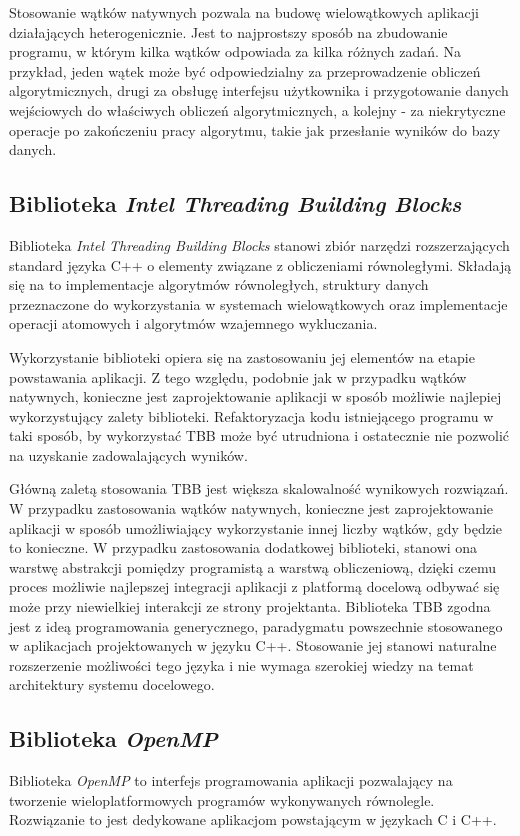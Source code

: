 Stosowanie wątków natywnych pozwala na budowę wielowątkowych aplikacji działających heterogenicznie. Jest to najprostszy sposób na zbudowanie programu, w którym kilka wątków odpowiada za kilka różnych zadań. Na przykład, jeden wątek może być odpowiedzialny za przeprowadzenie obliczeń algorytmicznych, drugi za obsługę interfejsu użytkownika i przygotowanie danych wejściowych do właściwych obliczeń algorytmicznych, a kolejny - za niekrytyczne operacje po zakończeniu pracy algorytmu, takie jak przesłanie wyników do bazy danych.

\subsection{Biblioteka \emph{Intel Threading Building Blocks}}

Biblioteka \emph{Intel Threading Building Blocks} stanowi zbiór narzędzi rozszerzających standard języka C++ o elementy związane z obliczeniami równoległymi. Składają się na to implementacje algorytmów równoległych, struktury danych przeznaczone do wykorzystania w systemach wielowątkowych oraz implementacje operacji atomowych i algorytmów wzajemnego wykluczania. \cite{Reinders2010}

Wykorzystanie biblioteki opiera się na zastosowaniu jej elementów na etapie powstawania aplikacji. Z tego względu, podobnie jak w przypadku wątków natywnych, konieczne jest zaprojektowanie aplikacji w sposób możliwie najlepiej wykorzystujący zalety biblioteki. Refaktoryzacja kodu istniejącego programu w taki sposób, by wykorzystać TBB może być utrudniona i ostatecznie nie pozwolić na uzyskanie zadowalających wyników.

Główną zaletą stosowania TBB jest większa skalowalność wynikowych rozwiązań. W przypadku zastosowania wątków natywnych, konieczne jest zaprojektowanie aplikacji w sposób umożliwiający wykorzystanie innej liczby wątków, gdy będzie to konieczne. W przypadku zastosowania dodatkowej biblioteki, stanowi ona warstwę abstrakcji pomiędzy programistą a warstwą obliczeniową, dzięki czemu proces możliwie najlepszej integracji aplikacji z platformą docelową odbywać się może przy niewielkiej interakcji ze strony projektanta.
Biblioteka TBB zgodna jest z ideą programowania generycznego, paradygmatu powszechnie stosowanego w aplikacjach projektowanych w języku C++. Stosowanie jej stanowi naturalne rozszerzenie możliwości tego języka i nie wymaga szerokiej wiedzy na temat architektury systemu docelowego.

\subsection{Biblioteka \emph{OpenMP}}
Biblioteka \emph{OpenMP} to interfejs programowania aplikacji pozwalający na tworzenie wieloplatformowych programów wykonywanych równolegle. Rozwiązanie to jest dedykowane aplikacjom powstającym w językach C i C++.\cite{openmp-guide}


